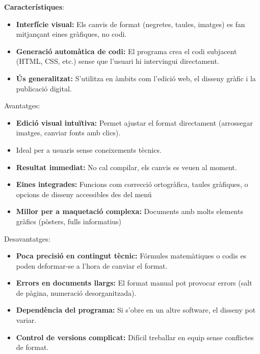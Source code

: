 \textbf{Característiques}:
\begin{itemize}
 \item \textbf{Interfície visual:} Els canvis de format (negretes, taules, imatges) es fan mitjançant eines gràfiques, no codi.
 \item \textbf{Generació automàtica de codi:} El programa crea el codi subjacent (HTML, CSS, etc.) sense que l'usuari hi intervingui directament.
 \item \textbf{Ús generalitzat:} S'utilitza en àmbits com l'edició web, el disseny gràfic i la publicació digital.
\end{itemize}
Avantatges:
\begin{itemize}
\item \textbf{Edició visual intuïtiva:} Permet ajustar el format directament (arrossegar imatges, canviar fonts amb clics).
 \item Ideal per a usuaris sense coneixements tècnics.
\item \textbf{Resultat immediat:} No cal compilar, els canvis es veuen al moment.
\item \textbf{Eines integrades:} Funcions com correcció ortogràfica, taules gràfiques, o opcions de disseny accessibles des del menú
\item \textbf{Millor per a maquetació complexa:} Documents amb molts elements gràfics (pòsters, fulls informatius)
\end{itemize}
Desavantatges:
\begin{itemize}
 \item \textbf{Poca precisió en contingut tècnic:} Fórmules matemàtiques o codis es poden deformar-se a l'hora de canviar el format.
 \item \textbf{Errors en documents llargs:} El format manual pot provocar errors (salt de pàgina, numeració desorganitzada).
 \item \textbf{Dependència del programa:} Si s'obre en un altre software, el disseny pot variar.
 \item \textbf{Control de versions complicat:} Difícil treballar en equip sense conflictes de format.
\end{itemize}

